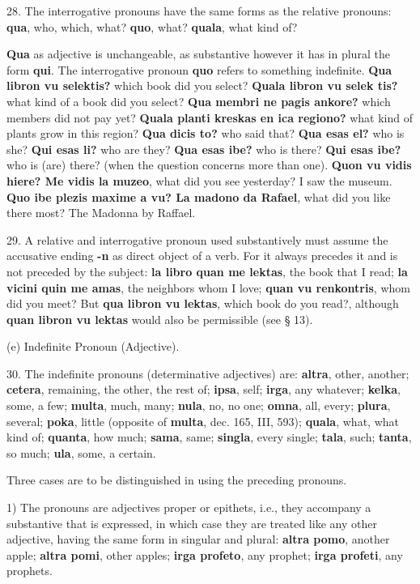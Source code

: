 28. The interrogative pronouns have the same forms as the relative pronouns: \textbf{qua}, who, which, what? \textbf{quo}, what? \textbf{quala}, what kind of? 

\textbf{Qua} as adjective is unchangeable, as substantive however it has in plural the form \textbf{qui}. The interrogative pronoun \textbf{quo} refers to something indefinite. \textbf{Qua libron vu selektis?} which book did you select? \textbf{Quala libron vu selek tis?} what kind of a book did you select? \textbf{Qua membri ne pagis ankore?} which members did not pay yet? \textbf{Quala planti kreskas en ica regiono?} what kind of plants grow in this region? \textbf{Qua dicis to?} who said that? \textbf{Qua esas el?} who is she? \textbf{Qui esas li?} who are they? \textbf{Qua esas ibe?} who is there? \textbf{Qui esas ibe?} who is (are) there? (when the question concerns more than one). \textbf{Quon vu vidis hiere? Me vidis la muzeo}, what did you see yesterday? I saw the museum. \textbf{Quo ibe plezis maxime a vu? La madono da Rafael}, what did you like there most? The Madonna by Raffael. 

29. A relative and interrogative pronoun used substantively must assume the accusative ending \textbf{-n} as direct object of a verb. For it always precedes it and is not preceded by the subject: \textbf{la libro quan me lektas}, the book that I read; \textbf{la vicini quin me amas}, the neighbors whom I love; \textbf{quan vu renkontris}, whom did you meet? But \textbf{qua libron vu lektas}, which book do you read?, although \textbf{quan libron vu lektas} would also be permissible (see § 13). 

\Centering (e) Indefinite Pronoun (Adjective). \\ \justifying

30. The indefinite pronouns (determinative adjectives) are: \textbf{altra}, other, another; \textbf{cetera}, remaining, the other, the rest of; \textbf{ipsa}, self; \textbf{irga}, any whatever; \textbf{kelka}, some, a few; \textbf{multa}, much, many; \textbf{nula}, no, no one; \textbf{omna}, all, every; \textbf{plura}, several; \textbf{poka}, little (opposite of \textbf{multa}, dec. 165, III, 593); \textbf{quala}, what, what kind of; \textbf{quanta}, how much; \textbf{sama}, same; \textbf{singla}, every single; \textbf{tala}, such; \textbf{tanta}, so much; \textbf{ula}, some, a certain. 

Three cases are to be distinguished in using the preceding pronouns. 

1) The pronouns are adjectives proper or epithets, i.e., they accompany a substantive that is expressed, in which case they are treated like any other adjective, having the same form in singular and plural: \textbf{altra pomo}, another apple; \textbf{altra pomi}, other apples; \textbf{irga profeto}, any prophet; \textbf{irga profeti}, any prophets. 

